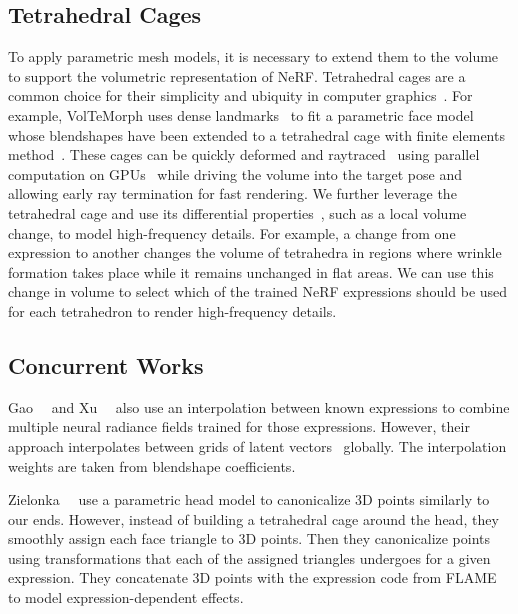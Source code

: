   \subsection{Tetrahedral Cages}
    To apply parametric mesh models, it is necessary to extend them to the volume
    to support the volumetric representation of NeRF.
    Tetrahedral cages are a common choice for their simplicity and ubiquity in
    computer graphics~\cite{garbin2024voltemorph,yang2022neumesh,xu2022deforming}.
    For example, VolTeMorph uses dense landmarks~\cite{wood20223d} to fit a
    parametric face model whose blendshapes have been extended to a tetrahedral
    cage with finite elements method~\cite{clough1960thefe}.
    These cages can be quickly deformed and raytraced~\cite{molino2003tetrahedral}
    using parallel computation on GPUs~\cite{cook2012cuda} while driving the
    volume into the target pose and allowing early ray termination for fast
    rendering.
    We further leverage the tetrahedral cage and use its differential
    properties~\cite{irving2004invertible}, such as a local volume change, to
    model high-frequency details.
    For example, a change from one expression to another changes the volume of
    tetrahedra in regions where wrinkle formation takes place while it remains
    unchanged in flat areas.
    We can use this change in volume to select which of the trained NeRF
    expressions should be used for each tetrahedron to render high-frequency
    details.

  \subsection{Concurrent Works}
    Gao~\etal~\cite{gao2022reconstructing} and Xu~\etal~\cite{xu2023avatarmav}
    also use an interpolation between known expressions to combine multiple neural
    radiance fields trained for those expressions.
    However, their approach interpolates between grids of latent
    vectors~\cite{mueller2022instant} globally.
    The interpolation weights are taken from blendshape coefficients.

    Zielonka~\etal~\cite{zielonka2022instant} use a parametric head model to
    canonicalize 3D points similarly to our ends.
    However, instead of building a tetrahedral cage around the head, they smoothly
    assign each face triangle to 3D points.
    Then they canonicalize points using transformations that each of the assigned
    triangles undergoes for a given expression.
    They concatenate 3D points with the expression code from
    FLAME~\cite{li2017flame} to model expression-dependent effects.
